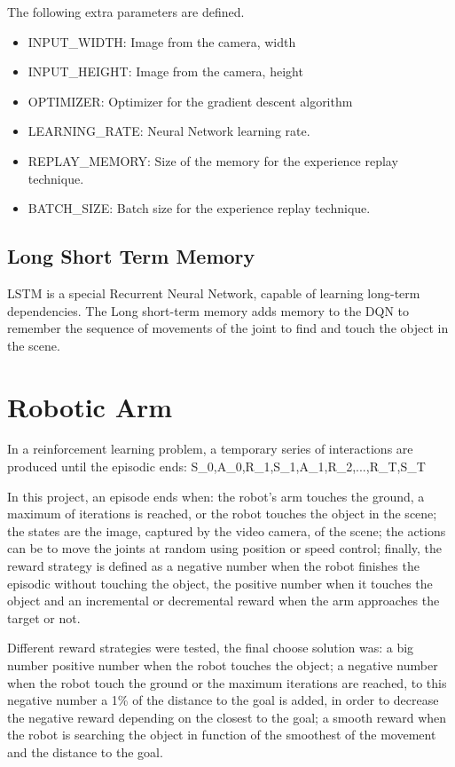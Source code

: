 \documentclass[10pt,journal,compsoc]{IEEEtran}
\begin{document}
The following extra parameters are defined.

\begin{itemize}
\item  INPUT\_WIDTH: Image from the camera, width
\item  INPUT\_HEIGHT: Image from the camera, height
\item  OPTIMIZER: Optimizer for the gradient descent algorithm 
\item  LEARNING\_RATE: Neural Network learning rate.
\item  REPLAY\_MEMORY: Size of the memory for the experience replay technique.
\item  BATCH\_SIZE: Batch size for the experience replay technique.
\end{itemize}

\subsection{Long Short Term Memory}

LSTM is a special Recurrent Neural Network, capable of learning long-term dependencies. The Long short-term memory adds memory to the DQN to remember the sequence of movements of the joint to find and touch the object in the scene.

\section{Robotic Arm}

In a reinforcement learning problem, a temporary series of interactions are produced until the episodic ends: S_{0},A_{0},R_{1},S_{1},A_{1},R_{2},...,R_{T},S_{T}

In this project, an episode ends when: the robot's arm touches the ground, a maximum of iterations is reached, or the robot touches the object in the scene; the states are the image, captured by the video camera, of the scene; the actions can be to move the joints at random using position or speed control; finally, the reward strategy is defined as a negative number when the robot finishes the episodic without touching the object, the positive number when it touches the object and an incremental or decremental reward when the arm approaches the target or not.

Different reward strategies were tested, the final choose solution was: a big number positive number when the robot touches the object; a negative number when the robot touch the ground or the maximum iterations are reached, to this negative number a 1\% of the distance to the goal is added, in order to decrease the negative reward depending on the closest to the goal; a smooth reward when the robot is searching the object in function of the smoothest of the movement and the distance to the goal.
\end{document}
